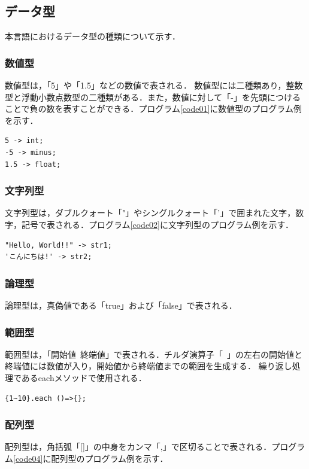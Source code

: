 \documentclass[10pt,a4j]{ltjsarticle}
\begin{document}
\subsection{データ型}
本言語におけるデータ型の種類について示す．
\subsubsection{数値型}
数値型は，「5」や「1.5」などの数値で表される．
数値型には二種類あり，整数型と浮動小数点数型の二種類がある．また，数値に対して「-」を先頭につけることで負の数を表すことができる．プログラム\ref{code01}に数値型のプログラム例を示す．

\begin{lstlisting}[caption=数値型のプログラム例, label=code01]
5 -> int;
-5 -> minus;
1.5 -> float;
\end{lstlisting}

\subsubsection{文字列型}
文字列型は，ダブルクォート「"」やシングルクォート「'」で囲まれた文字，数字，記号で表される．プログラム\ref{code02}に文字列型のプログラム例を示す．

\begin{lstlisting}[caption=文字列型のプログラム例, label=code02]
"Hello, World!!" -> str1;
'こんにちは!' -> str2;
\end{lstlisting}

\subsubsection{論理型}
論理型は，真偽値である「true」および「false」で表される．

\subsubsection{範囲型}
範囲型は，「開始値~終端値」で表される．チルダ演算子「~」の左右の開始値と終端値には数値が入り，開始値から終端値までの範囲を生成する．
繰り返し処理であるeachメソッドで使用される．

\begin{lstlisting}[caption=範囲型のプログラム例, label=code03]
{1~10}.each ()=>{};
\end{lstlisting}

\subsubsection{配列型}
配列型は，角括弧「[]」の中身をカンマ「,」で区切ることで表される．プログラム\ref{code04}に配列型のプログラム例を示す．
\end{document}

